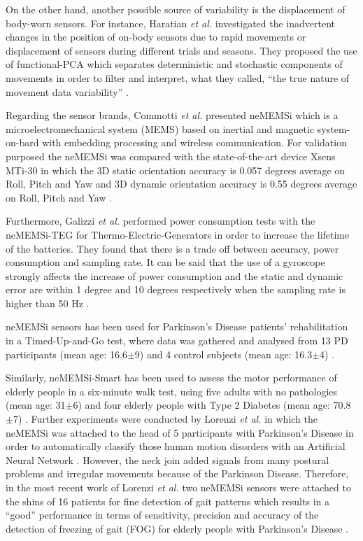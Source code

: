 \documentclass[9pt,journal,onecolumn,compsoc]{IEEEtran}
\begin{document}
On the other hand, another possible source of variability is the displacement of body-worn sensors. 
For instance, Haratian \textit{et al.} investigated the inadvertent changes in the position of on-body sensors 
due to rapid movements or displacement of sensors during different trials and seasons.
They proposed the use of functional-PCA 
which separates deterministic and stochastic components of movements
in order to filter and interpret, what they called, ``the true nature of movement data variability'' 
\cite{Haratian2012,Haratian2014,Haratian2016}.



Regarding the sensor brands, 
Commotti \textit{et al.} presented neMEMSi which is a microelectromechanical system (MEMS)  based on 
inertial and magnetic system-on-bard with embedding processing and wireless communication.
For validation purposed the neMEMSi was compared with the state-of-the-art device Xsens MTi-30
in which the 3D static orientation accuracy is 0.057 degrees average on Roll, Pitch and Yaw 
and 3D dynamic orientation accuracy is 0.55 degrees average on Roll, Pitch and Yaw \cite{Comotti2014}.

Furthermore, Galizzi \textit{et al.} performed power consumption tests with the 
neMEMSi-TEG for Thermo-Electric-Generators in order to increase the lifetime of the batteries.
They found that there is a trade off between accuracy, power consumption and sampling rate.
It can be said that the use of a gyroscope strongly affects the increase of power consumption
and the static and dynamic error are within 1 degree and 10 degrees respectively 
when the sampling rate is higher than 50 Hz \cite{Galizzi2015}.

neMEMSi sensors has been used for Parkinson's Disease patients' rehabilitation 
in a Timed-Up-and-Go test, where data was gathered and analysed from 
13 PD participants (mean age: 16.6$\pm$9) and 4 control subjects (mean age: 16.3$\pm$4) \cite{Caldara2014}.

Similarly, neMEMSi-Smart has been used to assess the motor performance of elderly people
in a six-minute walk test, using five adults with no pathologies (mean age: 31$\pm$6) and four elderly people with Type 2 Diabetes 
(mean age: 70.8$\pm$7) \cite{Caldara2015}.
Further experiments were conducted by Lorenzi \textit{et al.} in which the neMEMSi was attached to the head 
of 5 participants  with Parkinson's Disease in order to 
automatically classify those human motion disorders with an Artificial Neural Network \cite{Lorenzi2015}.
However, the neck join added signals from many postural problems
and irregular movements because of the Parkinson Disease.
Therefore, in the most recent work of Lorenzi \textit{et al.} two neMEMSi sensors were attached to the shins
of 16 patients for fine detection of gait patterns
which results in a ``good'' performance in terms of sensitivity, precision and accuracy of 
the detection of freezing of gait (FOG) for elderly people with Parkinson's Disease  \cite{Lorenzi2016}.
\end{document}
